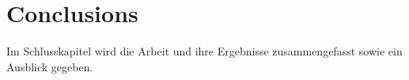 \chapter{Conclusions}
Im Schlusskapitel wird die Arbeit und ihre Ergebnisse zusammengefasst sowie ein Ausblick gegeben.


\begin{comment}
    MQTT is not suitable. Very involved interactions are hard to model.
    Trust is distributed and mpc want to avoid single point of failure. However, due to communication the broker inavitably becomes a single point of failure. A true d2d communication is needed. Consensus of the Guardians is hard to model. Elect a leader of dishonest majority

    Mesh network inherent decentralised nature is great however, we are limited by the bandwidth of the network. Can adapt to changes to the topology

    The redundancy and self-healing nature of mesh networks could ensure that the necessary quorum of guardians can still communicate and collaborate effectively.

    Device discovery

    Synchronisation challenges. 

\end{comment}
